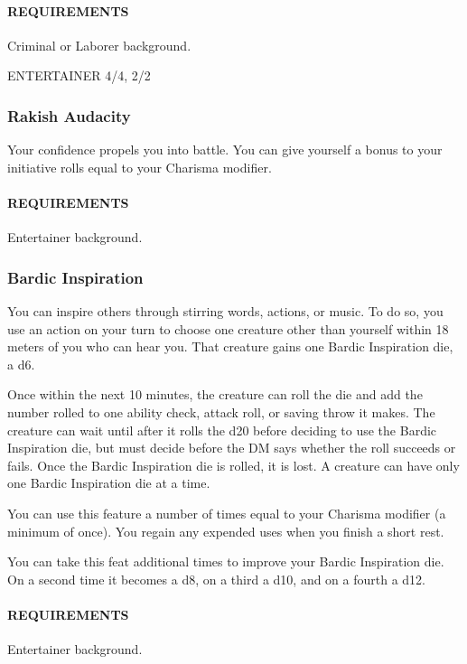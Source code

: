         \paragraph{REQUIREMENTS} Criminal or Laborer background.

ENTERTAINER 4/4, 2/2
    \subsubsection{Rakish Audacity} \label{feat::rakishaudacity}
        Your confidence propels you into battle.
        You can give yourself a bonus to your initiative rolls equal to your Charisma modifier.
        \paragraph{REQUIREMENTS} Entertainer background.

    \subsubsection{Bardic Inspiration} \label{feat::bardicinspiration}
        You can inspire others through stirring words, actions, or music.
        To do so, you use an action on your turn to choose one creature other than yourself within 18 meters of you who can hear you.
        That creature gains one Bardic Inspiration die, a d6.

        Once within the next 10 minutes, the creature can roll the die and add the number rolled to one ability check, attack roll, or saving throw it makes.
        The creature can wait until after it rolls the d20 before deciding to use the Bardic Inspiration die, but must decide before the DM says whether the roll succeeds or fails.
        Once the Bardic Inspiration die is rolled, it is lost.
        A creature can have only one Bardic Inspiration die at a time.

        You can use this feature a number of times equal to your Charisma modifier (a minimum of once).
        You regain any expended uses when you finish a short rest.

        You can take this feat additional times to improve your Bardic Inspiration die.
        On a second time it becomes a d8, on a third a d10, and on a fourth a d12.

        \paragraph{REQUIREMENTS} Entertainer background.

